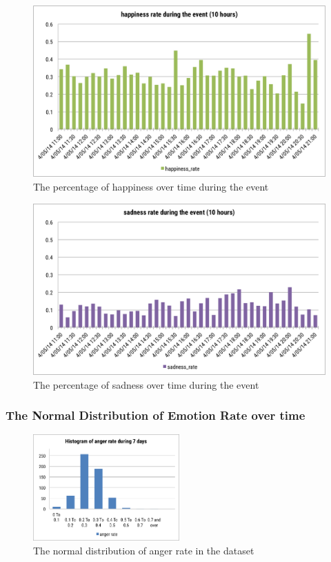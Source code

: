 \begin{figure}[htb!] 
\centering    
\includegraphics[width=1.0\textwidth]{HappinessRateEvent}
\caption{The percentage of happiness over time during the event}
\label{fig:happinessRateEvent}
\end{figure}

\begin{figure}[htb!] 
\centering    
\includegraphics[width=1.0\textwidth]{SadnessRateEvent}
\caption{The percentage of sadness over time during the event}
\label{fig:sadnessRateEvent}
\end{figure}

\subsubsection{The Normal Distribution of Emotion Rate over time}
\begin{figure}[htb!] 
\centering    
\includegraphics[width=0.5\textwidth]{HistogramAngerWeek}
\caption{The normal distribution of anger rate in the dataset}
\label{fig:histogramAngerWeek}
\end{figure}

